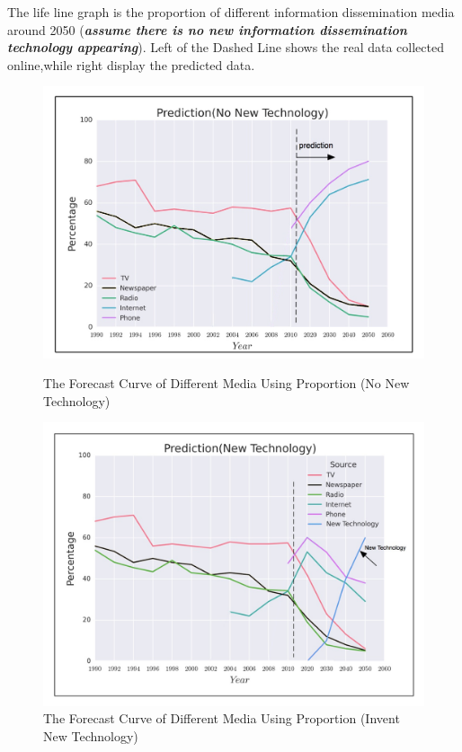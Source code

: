 \documentclass[a4paper,11pt]{article}
\begin{document}
\par The life line graph is the proportion of different information dissemination media around 2050 (\textbf{\emph{assume there is no new information dissemination technology appearing}}).  Left of the Dashed Line shows the real data collected online,while right display the predicted data.

\begin{figure}[!h]
  \centering %
  \begin{minipage}[t]{.49\linewidth}
  \includegraphics[width=1\textwidth]{./Pic/P3_21.jpg}
  \caption{The Forecast Curve of Different Media Using Proportion (No New Technology)}
  \end{minipage}
  \begin{minipage}[t]{.47\linewidth}
  \includegraphics[width=1\textwidth]{./Pic/P3_22.jpg}
  \caption{The Forecast Curve of Different Media Using Proportion (Invent New Technology)}
  \end{minipage}
\end{figure}
\end{document}
